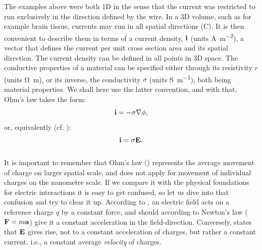 The examples above were both 1D in the sense that the current was restricted to run exclusively in the direction defined by the wire. In a 3D volume, such as for example brain tissue, currents may run in all spatial directions (C). It is then convenient to describe them in terms of a current density, ${\bf i}$ (units \si{\ampere\per\square\metre}), a vector that defines the current per unit cross section area and its spatial direction. The current density can be defined in all points in 3D space. The conductive properties of a material can be specified either through its resistivity $r$ (units \si{\ohm\metre}), or its inverse, the conductivity $\sigma$ (units \si{\siemens\per\metre}), both being material properties. We shall here use the latter convention, and with that, Ohm's law takes the form:
\begin{equation}
{\bf i} = - \sigma {\bf \nabla} \phi,
\label{eq:Basics:Ohm_3D_phi}
\end{equation}
%
or, equivalently (cf. ):
\begin{equation}
{\bf i} = \sigma {\bf E}.
\label{eq:Basics:Ohm_general}
\end{equation}


\subsubsection{}
\label{sec:Basics:Note}
It is important to remember that Ohm's law () represents the average movement of charge on larger spatial scale, and does not apply for movement of individual charges on the nanometre scale. If we compare it with the physical foundations for electric interactions it is easy to get confused, so let us dive into that confusion and try to clear it up. According to , an electric field acts on a reference charge $q$ by a constant force, and should according to Newton's law (${\bf F} = m{\bf a}$) give it a constant acceleration in the field-direction. Conversely,  states that ${\bf E}$ gives rise, not to a constant acceleration of charges, but rather a constant current, i.e., a constant average \textit{velocity} of charges.


